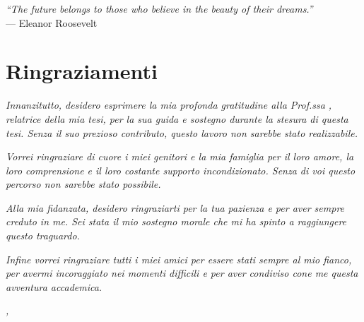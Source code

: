 \cleardoublepage{}

\begin{flushright}{
    \slshape
    ``The future belongs to those who believe in the beauty of their dreams.''} \\
    \medskip
    --- Eleanor Roosevelt
\end{flushright}


\bigskip

\begingroup
\let\clearpage\relax
\let\cleardoublepage\relax
\let\cleardoublepage\relax

\chapter*{Ringraziamenti}

\noindent \textit{Innanzitutto, desidero esprimere la mia profonda gratitudine alla Prof.ssa \myProf, relatrice della mia tesi, per la sua guida e sostegno durante la stesura di questa tesi. Senza il suo prezioso contributo, questo lavoro non sarebbe stato realizzabile.\\}

\noindent \textit{Vorrei ringraziare di cuore i miei genitori e la mia famiglia per il loro amore, la loro comprensione e il loro costante supporto incondizionato. Senza di voi questo percorso non sarebbe stato possibile.\\}

\noindent \textit{Alla mia fidanzata, desidero ringraziarti per la tua pazienza e per aver sempre creduto in me. Sei stata il mio sostegno morale che mi ha spinto a raggiungere questo traguardo. \\}

\noindent \textit{Infine vorrei ringraziare tutti i miei amici per essere stati sempre al mio fianco, per avermi incoraggiato nei momenti difficili e per aver condiviso cone me questa avventura accademica.\\}



\bigskip

\noindent\textit{\myLocation, \myTime}
\hfill \myName\endgroup
